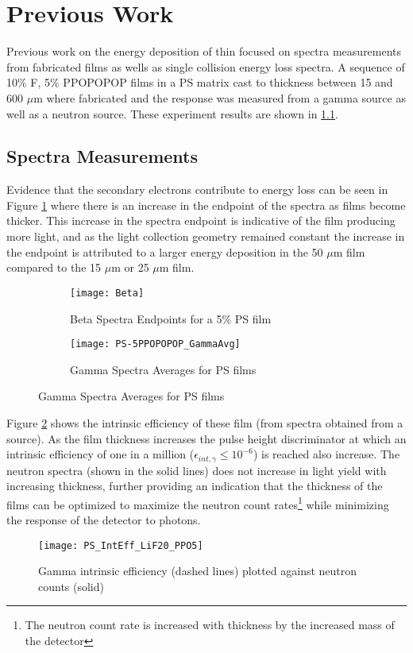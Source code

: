 
\section{Previous Work}
\label{sec:PreviousWork}
Previous work on the energy deposition of thin focused on spectra measurements from fabricated films as wells as single collision energy loss spectra.
A sequence of 10\% F, 5\% PPOPOPOP films in a PS matrix cast to thickness between 15 and 600 $\mu$m where fabricated and the response was measured from a gamma source as well as a neutron source.
These experiment results are shown in \ref{sec:SpectraMeasurements}.


\subsection{Spectra Measurements}
\label{sec:SpectraMeasurements}
Evidence that the secondary electrons contribute to energy loss can be seen in Figure \ref{fig:SpectraFeatures} where there is an increase in the endpoint of the spectra as films become thicker.
This increase in the spectra endpoint is indicative of the film producing more light, and as the light collection geometry remained constant the increase in the endpoint is attributed to a larger energy deposition in the 50 $\mu$m film compared to the 15 $\mu$m or 25 $\mu$m film.
\begin{figure}
    \centering
    \caption{Spectra properties as a function of film thickness}
    \begin{subfigure}[b]{0.45\figurewidth}
        \texttt{[image: Beta]}
        \caption{Beta Spectra Endpoints for a 5\% PS film}
    \end{subfigure}
    \begin{subfigure}[b]{0.45\figurewidth}
        \texttt{[image: PS-5PPOPOPOP\_GammaAvg]}
        \caption{Gamma Spectra Averages for PS films}
    \end{subfigure}
    \label{fig:SpectraFeatures}
\end{figure}
Figure \ref{fig:GammaIntrNeutronCounts} shows the intrinsic efficiency of these film (from spectra obtained from a  source).
As the film thickness increases the pulse height discriminator at which an intrinsic efficiency of one in a million ($\epsilon_{int,\gamma} \le 10^{-6}$) is reached also increase.
The neutron spectra (shown in the solid lines) does not increase in light yield with increasing thickness, further providing an indication that the thickness of the films can be optimized to maximize the neutron count rates\footnote{The neutron count rate is increased with thickness by the increased mass of the detector} while minimizing the response of the detector to photons.
\begin{figure}
    \centering
    \caption{Gamma intrinsic efficiency (dashed lines) plotted against neutron counts (solid)}
    \texttt{[image: PS\_IntEff\_LiF20\_PPO5]}
    \label{fig:GammaIntrNeutronCounts}
\end{figure}

